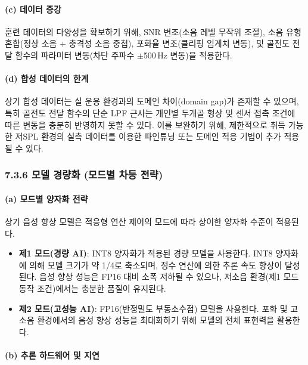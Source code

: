 \documentclass{article}
\begin{document}
\paragraph{(c) 데이터 증강}

훈련 데이터의 다양성을 확보하기 위해, SNR 변조(소음 레벨 무작위 조절), 소음 유형 혼합(정상 소음 + 충격성 소음 중첩), 포화율 변조(클리핑 임계치 변동), 및 골전도 전달 함수의 파라미터 변동(차단 주파수 $\pm$500\,Hz 변동)을 적용한다.

\paragraph{(d) 합성 데이터의 한계}

상기 합성 데이터는 실 운용 환경과의 도메인 차이(domain gap)가 존재할 수 있으며, 특히 골전도 전달 함수의 단순 LPF 근사는 개인별 두개골 형상 및 센서 접촉 조건에 따른 변동을 충분히 반영하지 못할 수 있다. 이를 보완하기 위해, 제한적으로 취득 가능한 저SPL 환경의 실측 데이터를 이용한 파인튜닝 또는 도메인 적응 기법이 추가 적용될 수 있다.

\subsubsection{7.3.6 모델 경량화 (모드별 차등 전략)}

\paragraph{(a) 모드별 양자화 전략}

상기 음성 향상 모델은 적응형 연산 제어의 모드에 따라 상이한 양자화 수준이 적용된다.

\begin{itemize}
    \item \textbf{제1 모드(경량 AI)}: INT8 양자화가 적용된 경량 모델을 사용한다. INT8 양자화에 의해 모델 크기가 약 1/4로 축소되며, 정수 연산에 의한 추론 속도 향상이 달성된다. 음성 향상 성능은 FP16 대비 소폭 저하될 수 있으나, 저소음 환경(제1 모드 동작 조건)에서는 충분한 품질이 유지된다.
    \item \textbf{제2 모드(고성능 AI)}: FP16(반정밀도 부동소수점) 모델을 사용한다. 포화 및 고소음 환경에서의 음성 향상 성능을 최대화하기 위해 모델의 전체 표현력을 활용한다.
\end{itemize}

\paragraph{(b) 추론 하드웨어 및 지연}
\end{document}
